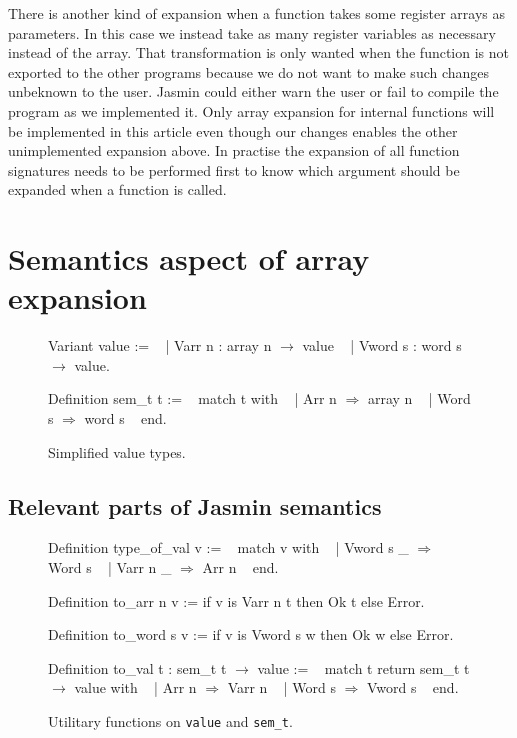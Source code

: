 \documentclass{article}
\begin{document}
\medskip

There is another kind of expansion when a function takes some register arrays as
parameters. In this case we instead take as many register variables as necessary
instead of the array. That transformation is only wanted when the function is
not exported to the other programs because we do not want to make such changes
unbeknown to the user. Jasmin could either warn the user or fail to compile the
program as we implemented it.
Only array expansion for internal functions will be implemented in this article
even though our changes enables the other unimplemented expansion above.
In practise the expansion of all function signatures needs to be performed first
to know which argument should be expanded when a function is called.


\section{Semantics aspect of array expansion}\label{sec:semantics}

\begin{figure}[t]
\obeylines\obeyspaces\ttfamily%
Variant value :=
~ | Varr  n : array n \(\rightarrow\) value
~ | Vword s : word  s \(\rightarrow\) value.

Definition sem\_t t :=
~ match t with
~ | Arr  n \(\Rightarrow\) array n
~ | Word s \(\Rightarrow\) word  s
~ end.
\normalfont%
\caption{Simplified value types.}\label{fig:val}
\end{figure}

\subsection{Relevant parts of Jasmin semantics}

\begin{figure}[t]
\obeylines\obeyspaces\ttfamily%
Definition type\_of\_val v :=
~ match v with
~ | Vword s \_ \(\Rightarrow\) Word s
~ | Varr  n \_ \(\Rightarrow\) Arr  n
~ end.

Definition to\_arr  n v := if v is Varr  n t then Ok t else Error.

Definition to\_word s v := if v is Vword s w then Ok w else Error.

Definition to\_val t : sem\_t t \(\rightarrow\) value :=
~ match t return sem\_t t \(\rightarrow\) value with
~ | Arr  n \(\Rightarrow\) Varr  n
~ | Word s \(\Rightarrow\) Vword s
~ end.
\normalfont%
\caption{Utilitary functions on \texttt{value} and \texttt{sem\_t}.}
\end{figure}
\end{document}
